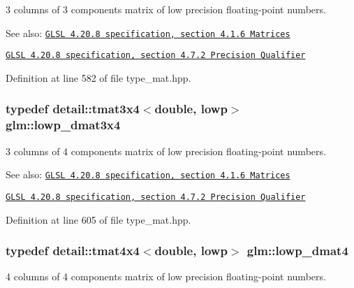 3 columns of 3 components matrix of low precision floating-point numbers.

\begin{Desc}
\item[See also:]\href{http://www.opengl.org/registry/doc/GLSLangSpec.4.20.8.pdf}{\tt GLSL 4.20.8 specification, section 4.1.6 Matrices} 

\href{http://www.opengl.org/registry/doc/GLSLangSpec.4.20.8.pdf}{\tt GLSL 4.20.8 specification, section 4.7.2 Precision Qualifier} \end{Desc}


Definition at line 582 of file type\_\-mat.hpp.\hypertarget{group__core__precision_g4640e1d20ad705842525e79a4cc57b15}{
\subsubsection[lowp\_\-dmat3x4]{\setlength{\rightskip}{0pt plus 5cm}typedef detail::tmat3x4$<$double, lowp$>$ {\bf glm::lowp\_\-dmat3x4}}}
\label{group__core__precision_g4640e1d20ad705842525e79a4cc57b15}


3 columns of 4 components matrix of low precision floating-point numbers.

\begin{Desc}
\item[See also:]\href{http://www.opengl.org/registry/doc/GLSLangSpec.4.20.8.pdf}{\tt GLSL 4.20.8 specification, section 4.1.6 Matrices} 

\href{http://www.opengl.org/registry/doc/GLSLangSpec.4.20.8.pdf}{\tt GLSL 4.20.8 specification, section 4.7.2 Precision Qualifier} \end{Desc}


Definition at line 605 of file type\_\-mat.hpp.\hypertarget{group__core__precision_gea69794db4e619881b77d37bf84b337e}{
\subsubsection[lowp\_\-dmat4]{\setlength{\rightskip}{0pt plus 5cm}typedef detail::tmat4x4$<$double, lowp$>$ {\bf glm::lowp\_\-dmat4}}}
\label{group__core__precision_gea69794db4e619881b77d37bf84b337e}


4 columns of 4 components matrix of low precision floating-point numbers.

